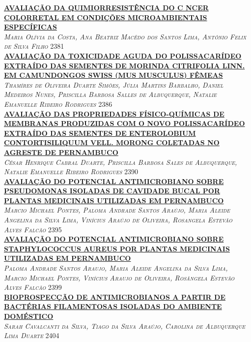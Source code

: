 \noindent \textsc{\hyperlink{trabalhos/250043.pdf.1}{\textbf{AVALIAÇÃO DA QUIMIORRESISTÊNCIA DO C NCER COLORRETAL EM CONDIÇÕES MICROAMBIENTAIS ESPECÍFICAS}}}\\ 
\noindent \textsc{\textit{Maria Olívia da Costa, Ana Beatriz Macêdo dos Santos Lima, Antônio Felix de Silva Filho}} \hfill 2381\\ 

\noindent \textsc{\hyperlink{trabalhos/250234.pdf.1}{\textbf{AVALIAÇÃO DA TOXICIDADE AGUDA DO POLISSACARÍDEO EXTRAÍDO DAS SEMENTES DE MORINDA CITRIFOLIA LINN. EM CAMUNDONGOS SWISS (MUS MUSCULUS) FÊMEAS}}}\\ 
\noindent \textsc{\textit{Thamíres de Oliveira Duarte Simões, Júlia Martins Barbalho, Daniel Medeiros Nunes, Priscilla Barbosa Salles de Albuquerque, Natalie Emanuelle Ribeiro Rodrigues}} \hfill 2386\\ 

\noindent \textsc{\hyperlink{trabalhos/251302.pdf.1}{\textbf{AVALIAÇÃO DAS PROPRIEDADES FÍSICO-QUÍMICAS DE MEMBRANAS PRODUZIDAS COM O NOVO POLISSACARÍDEO EXTRAÍDO DAS SEMENTES DE ENTEROLOBIUM CONTORTISILIQUUM VELL. MORONG COLETADAS NO AGRESTE DE PERNAMBUCO}}}\\ 
\noindent \textsc{\textit{César Henrique Cabral Duarte, Priscilla Barbosa Sales de Albuquerque, Natalie Emanuelle Ribeiro Rodrigues}} \hfill 2390\\ 

\noindent \textsc{\hyperlink{trabalhos/249356.pdf.1}{\textbf{AVALIAÇÃO DO POTENCIAL ANTIMICROBIANO SOBRE PSEUDOMONAS ISOLADAS DE CAVIDADE BUCAL POR PLANTAS MEDICINAIS UTILIZADAS EM PERNAMBUCO}}}\\ 
\noindent \textsc{\textit{Marcio Michael Pontes, Paloma Andrade Santos Araújo, Maria Aleide Angelina da Silva Lima, Vinícius Araújo de Oliveira, Rosangela Estevão Alves Falcão}} \hfill 2395\\ 

\noindent \textsc{\hyperlink{trabalhos/250096.pdf.1}{\textbf{AVALIAÇÃO DO POTENCIAL ANTIMICROBIANO SOBRE STAPHYLOCOCCUS AUREUS POR PLANTAS MEDICINAIS UTILIZADAS EM PERNAMBUCO }}}\\ 
\noindent \textsc{\textit{Paloma Andrade Santos Araujo, Maria Aleide Angelina da Silva Lima, Marcio Michael Pontes, Vinícius Araujo de Oliveira, Rosângela Estevão Alves Falcão}} \hfill 2399\\ 

\noindent \textsc{\hyperlink{trabalhos/250336.pdf.1}{\textbf{BIOPROSPECÇÃO DE ANTIMICROBIANOS A PARTIR DE BACTÉRIAS FILAMENTOSAS ISOLADAS DO AMBIENTE DOMÉSTICO}}}\\ 
\noindent \textsc{\textit{Sarah Cavalcanti da Silva, Tiago da Silva Araújo, Carolina de Albuquerque Lima Duarte}} \hfill 2404\\ 

